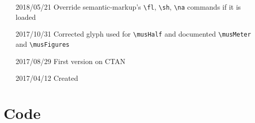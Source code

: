 \documentclass{article}
\begin{document}
\begin{itemize}
\begin{itemize}
                \begin{itemize}
                    \item Correct mistaken notehead symbol for values less than
                        quarter note (was hollow, now filled)
                    \item Add 32nd and 64th notes, regular and dotted varieties
                    \item \verb|\musSymbol| is now typeset inside an
                        \verb|\mbox| to fix alignment problems when used in
                        tables
                \end{itemize}
            \item New features (some requested in issue no. 1):
                \begin{itemize}
                    \item Add medieval perfect meter
                    \item Add aliases for  ($=$ corchea $=$ eighth note)
                    \item Replace musStack implementation with 
                    \item Add full figured-bass support
                \end{itemize}
        \end{itemize}
    \item[2018/05/21] Override semantic-markup's \verb|\fl|, \verb|\sh|,
        \verb|\na| commands if it is loaded
    \item[2017/10/31] Corrected glyph used for \verb|\musHalf| and documented
        \verb|\musMeter| and \verb|\musFigures|
    \item[2017/08/29] First version on CTAN
    \item[2017/04/12] Created
\end{itemize}

\section{Code}

\end{document}
